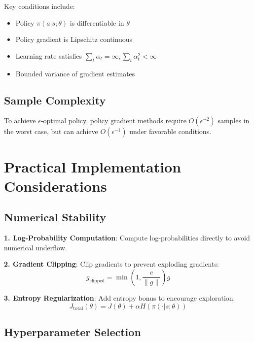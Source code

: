 Key conditions include:
\begin{itemize}
    \item Policy $\pi(a|s; \theta)$ is differentiable in $\theta$
    \item Policy gradient is Lipschitz continuous
    \item Learning rate satisfies $\sum_t \alpha_t = \infty, \sum_t \alpha_t^2 < \infty$
    \item Bounded variance of gradient estimates
\end{itemize}

\subsection{Sample Complexity}

\begin{theorem}
To achieve $\epsilon$-optimal policy, policy gradient methods require $O(\epsilon^{-2})$ samples in the worst case, but can achieve $O(\epsilon^{-1})$ under favorable conditions.
\end{theorem}

\section{Practical Implementation Considerations}

\subsection{Numerical Stability}

\textbf{1. Log-Probability Computation}: Compute log-probabilities directly to avoid numerical underflow.

\textbf{2. Gradient Clipping}: Clip gradients to prevent exploding gradients:
\begin{equation}
g_{\text{clipped}} = \min\left(1, \frac{c}{\|g\|}\right) g
\end{equation}

\textbf{3. Entropy Regularization}: Add entropy bonus to encourage exploration:
\begin{equation}
J_{\text{total}}(\theta) = J(\theta) + \alpha H(\pi(\cdot|s; \theta))
\end{equation}

\subsection{Hyperparameter Selection}

